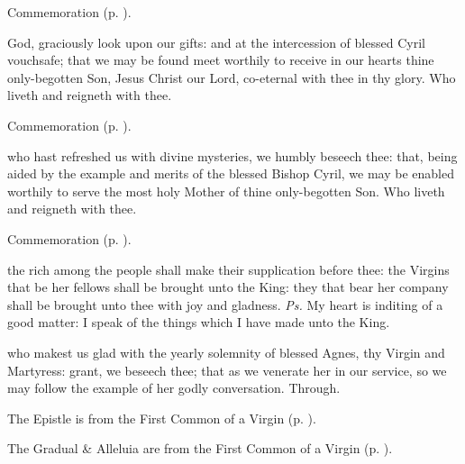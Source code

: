 \begin{rubric}
    Commemoration  (p. \pageref{AgnesCollectII}).
\end{rubric}

\secret
{} God, graciously look upon our gifts: and at the intercession of blessed Cyril vouchsafe; that we may be found meet worthily to receive in our hearts thine only-begotten Son, Jesus Christ our Lord, co-eternal with thee in thy glory. Who liveth and reigneth with thee.

\begin{rubric}
    Commemoration  (p. \pageref{AgnesSecretII}).
\end{rubric}

\postcommunion
{} who hast refreshed us with divine mysteries, we humbly beseech thee: that, being aided by the example and merits of the blessed Bishop Cyril, we may be enabled worthily to serve the most holy Mother of thine only-begotten Son. Who liveth and reigneth with thee.

\begin{rubric}
    Commemoration  (p. \pageref{AgnesPostcommunionII}).
\end{rubric}


\clearpage
{}

\introit
{} the rich among the people shall make their supplication before thee: the Virgins that be her fellows shall be brought unto the King: they that bear her company shall be brought unto thee with joy and gladness. \textit{Ps.} My heart is inditing of a good matter: I speak of the things which I have made unto the King.

\collect\label{AgnesCollectII}
 who makest us glad with the yearly solemnity of blessed Agnes, thy Virgin and Martyress: grant, we beseech thee; that as we venerate her in our service, so we may follow the example of her godly conversation. Through.

\begin{rubric}
	The Epistle is from the First Common of a Virgin (p. \pageref{CommonVirginOnlyIEpistle}).
\end{rubric}

\begin{rubric}
	The Gradual \& Alleluia are from the First Common of a Virgin (p. \pageref{CommonVirginOnlyI}).
\end{rubric}

